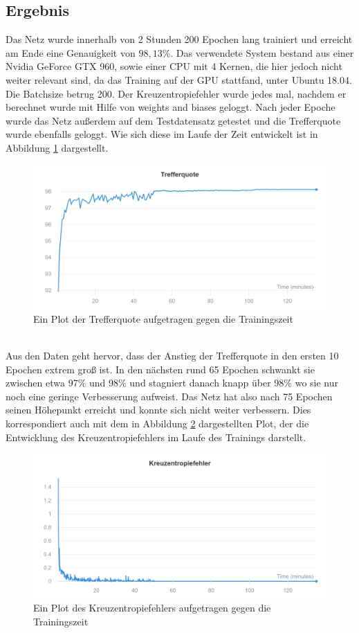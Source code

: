 \documentclass{article}
\begin{document}
\subsection{Ergebnis}
Das Netz wurde innerhalb von 2 Stunden 200 Epochen lang trainiert und erreicht am Ende eine Genauigkeit von $98,13\%$. Das verwendete System bestand aus einer Nvidia GeForce GTX 960, sowie einer CPU mit 4 Kernen, die hier jedoch nicht weiter relevant sind, da das Training auf der GPU stattfand, unter Ubuntu 18.04. Die Batchsize betrug 200. Der Kreuzentropiefehler wurde jedes mal, nachdem er berechnet wurde mit Hilfe von weights and biases geloggt. Nach jeder Epoche wurde das Netz außerdem auf dem Testdatensatz getestet und die Trefferquote wurde ebenfalls geloggt. Wie sich diese im Laufe der Zeit entwickelt ist in Abbildung \ref{accuracy} dargestellt.
\begin{figure}[h]
	\includegraphics[width=\linewidth]{../graphics/Wandb_accuracy.png}
	\caption{Ein Plot der Trefferquote aufgetragen gegen die Trainingszeit}
	\label{accuracy}
\end{figure}
\\
Aus den Daten geht hervor, dass der Anstieg der Trefferquote in den ersten 10 Epochen extrem groß ist. In den nächsten rund 65 Epochen schwankt sie zwischen etwa 97\% und 98\% und stagniert danach knapp über 98\% wo sie nur noch eine geringe Verbesserung aufweist. Das Netz hat also nach 75 Epochen seinen Höhepunkt erreicht und konnte sich nicht weiter verbessern. Dies korrespondiert auch mit dem in Abbildung \ref{loss} dargestellten Plot, der die Entwicklung des Kreuzentropiefehlers im Laufe des Trainings darstellt.
\begin{figure}[h]
	\includegraphics[width=\linewidth]{../graphics/Wandb_loss.png}
	\caption{Ein Plot des Kreuzentropiefehlers aufgetragen gegen die Trainingszeit}
	\label{loss}
\end{figure}
\end{document}
